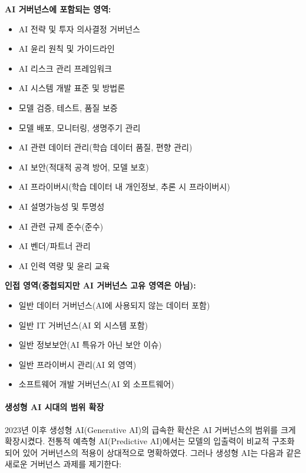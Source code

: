\textbf{AI 거버넌스에 포함되는 영역:}
\begin{itemize}
 \item AI 전략 및 투자 의사결정 거버넌스
 \item AI 윤리 원칙 및 가이드라인
 \item AI 리스크 관리 프레임워크
 \item AI 시스템 개발 표준 및 방법론
 \item 모델 검증, 테스트, 품질 보증
 \item 모델 배포, 모니터링, 생명주기 관리
 \item AI 관련 데이터 관리(학습 데이터 품질, 편향 관리)
 \item AI 보안(적대적 공격 방어, 모델 보호)
 \item AI 프라이버시(학습 데이터 내 개인정보, 추론 시 프라이버시)
 \item AI 설명가능성 및 투명성
 \item AI 관련 규제 준수(준수)
 \item AI 벤더/파트너 관리
 \item AI 인력 역량 및 윤리 교육
\end{itemize}

\textbf{인접 영역(중첩되지만 AI 거버넌스 고유 영역은 아님):}
\begin{itemize}
 \item 일반 데이터 거버넌스(AI에 사용되지 않는 데이터 포함)
 \item 일반 IT 거버넌스(AI 외 시스템 포함)
 \item 일반 정보보안(AI 특유가 아닌 보안 이슈)
 \item 일반 프라이버시 관리(AI 외 영역)
 \item 소프트웨어 개발 거버넌스(AI 외 소프트웨어)
\end{itemize}

\paragraph{생성형 AI 시대의 범위 확장}
2023년 이후 생성형 AI(Generative AI)의 급속한 확산은 AI 거버넌스의 범위를 크게 확장시켰다. 전통적 예측형 AI(Predictive AI)에서는 모델의 입출력이 비교적 구조화되어 있어 거버넌스의 적용이 상대적으로 명확하였다. 그러나 생성형 AI는 다음과 같은 새로운 거버넌스 과제를 제기한다:

